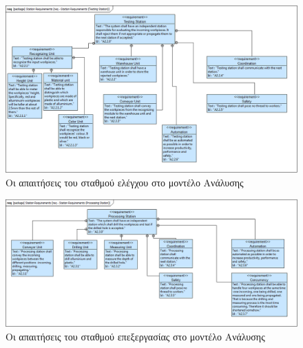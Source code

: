 \documentclass[a4paper,12pt,twoside]{report}
\begin{document}
{\begin{appendices}
			\begin{figure}[hp]
					\centering
					\includegraphics[scale=0.30]{AnalysisModel_req-StationRequirements(TestingStation).png}
					\caption{Οι απαιτήσεις του σταθμού ελέγχου στο μοντέλο Ανάλυσης}
					\label{φωτ:Οι απαιτήσεις του σταθμού ελέγχου στο μοντέλο Ανάλυσης}
			\end{figure}
			
			\begin{figure}[hp]
					\centering
					\includegraphics[scale=0.30]{AnalysisModel_req-StationRequirements(ProcessingStation).png}
					\caption{Οι απαιτήσεις του σταθμού επεξεργασίας στο μοντέλο Ανάλυσης}
					\label{φωτ:Οι απαιτήσεις του σταθμού επεξεργασίας στο μοντέλο Ανάλυσης}
			\end{figure}
			

\end{appendices}}
\end{document}
